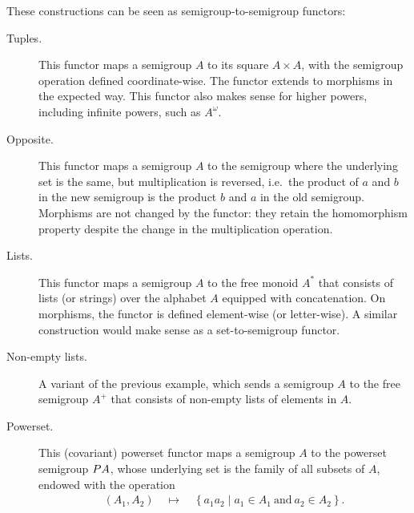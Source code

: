  \begin{example}\label{ex:functors}
 These constructions can be seen as semigroup-to-semigroup functors:
 \begin{description}
 \item[Tuples.] This functor maps a semigroup $A$ to its square $A \times A$, with the semigroup operation defined coordinate-wise. The functor extends to morphisms in the expected way. This functor also makes sense for higher powers, including infinite powers, such as $A^\omega$.
 \item[Opposite.] This functor maps a semigroup $A$ to the semigroup where the underlying set is the same, but multiplication is reversed, i.e.~the product of $a$ and $b$ in the new semigroup is the product $b$ and $a$ in the old semigroup. Morphisms are not changed by the functor: they retain the homomorphism property despite the change in the multiplication operation.
 \item[Lists.] This functor maps a semigroup $A$ to the free monoid $A^*$ that consists of lists (or strings) over the alphabet $A$ equipped with concatenation. On morphisms, the functor is defined element-wise (or letter-wise). A similar construction would make sense as a set-to-semigroup functor.
 \item[Non-empty lists.] A variant of the previous example, which sends a
   semigroup $A$ to the free semigroup $A^+$ that consists of non-empty lists of
   elements in $A$.
 \item[Powerset.] This (covariant) powerset functor maps a semigroup $A$ to the powerset semigroup $\powerset A$, whose underlying set is the family of all subsets of $A$, endowed with the operation
 \begin{align*}
 (A_1,A_2) \quad \mapsto \quad \left\{a_1 a_2 \mid a_1 \in A_1\ \text{and}\ a_2 \in A_2\right\}.
 \end{align*}
 \end{description}
 \end{example}

